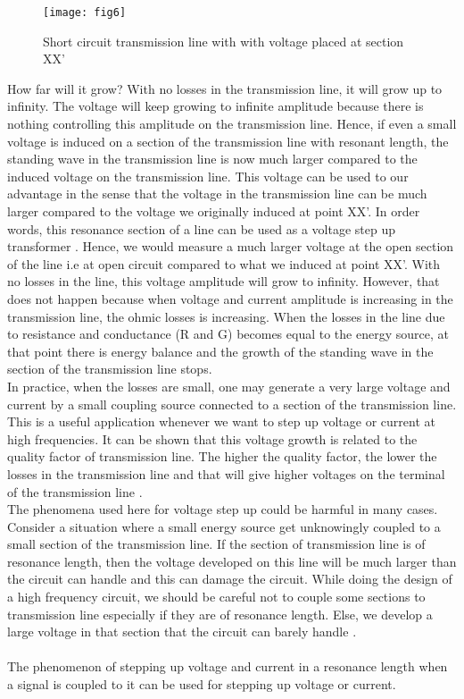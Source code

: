   \begin{figure}[h]
  	\centering
  	\texttt{[image: fig6]}
  \caption{Short circuit transmission line with with voltage placed at section XX'}
  
\end{figure}
  How far will it grow? With no losses in the transmission line, it will grow up to infinity. The voltage will keep growing to infinite amplitude because there is nothing  controlling this amplitude  on the transmission line. Hence, if even a small voltage is induced on a section  of the transmission line with resonant length, the standing wave in the transmission line is now much larger compared to the induced voltage on the transmission line. This voltage can be used to our advantage in the sense that the voltage  in the transmission line  can be much larger compared to the voltage we originally induced at point XX'.
  In order words, this resonance section of a line can be used  as a voltage step up transformer . Hence,  we would  measure  a much  larger  voltage at the open section of the line i.e at open circuit compared  to what we induced at point XX'. With no losses in the line, this voltage  amplitude will grow to infinity. However, that does  not happen because when voltage and current amplitude is increasing in the transmission line, the ohmic losses is increasing. When the losses in  the line due to resistance and conductance (R and G) becomes equal to the  energy source, at that point there is energy balance and the growth of the standing wave in the section of the transmission line stops.\\
  
  In practice, when the losses are small, one may generate a very large  voltage and current by a small coupling  source  connected  to a section  of the transmission line. This  is a useful application whenever we want to step up voltage or current at high frequencies. It can be shown that this voltage growth is related to the quality factor of transmission line. The higher the quality factor, the lower the losses in the transmission line and that will give higher voltages on the terminal of the transmission line .\\
  
  The phenomena used here for voltage step up could be harmful in many cases. Consider a situation where a small energy source get unknowingly coupled to a small section of the transmission line. If the section of transmission line is of resonance length, then the voltage developed on this line will be much larger than the circuit can handle and this can damage the circuit. While doing the design of a high frequency circuit, we should be careful not to couple some sections to transmission line especially if they are of resonance length. Else, we develop a large voltage in that section that the circuit can barely handle .\\\\
  The phenomenon of stepping up voltage and current in a resonance length when a signal is coupled to it can be used for stepping up voltage or current.\\
  
